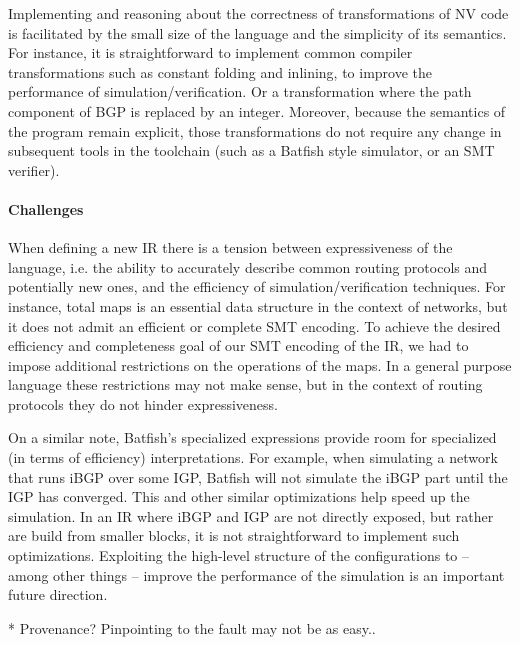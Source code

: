 \documentclass[sigconf,10pt]{acmart}
\begin{document}
Implementing and reasoning about the correctness of transformations of
NV code is facilitated by the small size of the language and the
simplicity of its semantics. For instance, it is straightforward to
implement common compiler transformations such as constant folding and
inlining, to improve the performance of simulation/verification. Or a
transformation where the path component of BGP is replaced by an
integer. Moreover, because the semantics of the program remain
explicit, those transformations do not require any change in
subsequent tools in the toolchain (such as a Batfish style simulator,
or an SMT verifier).

\paragraph{Challenges}

When defining a new IR there is a tension between expressiveness of
the language, i.e. the ability to accurately describe common routing
protocols and potentially new ones, and the efficiency of
simulation/verification techniques. For instance, total maps is an
essential data structure in the context of networks, but it does not
admit an efficient or complete SMT encoding. To achieve the desired
efficiency and completeness goal of our SMT encoding of the IR, we had
to impose additional restrictions on the operations of the maps. In a
general purpose language these restrictions may not make sense, but in
the context of routing protocols they do not hinder expressiveness.

On a similar note, Batfish's specialized expressions provide room for
specialized (in terms of efficiency) interpretations. For example,
when simulating a network that runs iBGP over some IGP, Batfish will
not simulate the iBGP part until the IGP has converged. This and other
similar optimizations help speed up the simulation. In an IR where
iBGP and IGP are not directly exposed, but rather are build from
smaller blocks, it is not straightforward to implement such
optimizations. Exploiting the high-level structure of the
configurations to -- among other things -- improve the performance of
the simulation is an important future direction.

* Provenance? Pinpointing to the fault may not be as easy..


 


\end{document}
